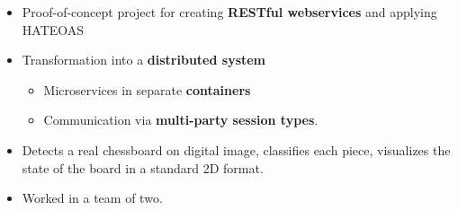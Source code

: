 

% 
% 
% 
% 
% 
% 






\begin{itemize}

\item Proof-of-concept project for creating \textbf{RESTful webservices} and applying HATEOAS

\item Transformation into a \textbf{distributed system}

\begin{itemize}
 \item Microservices in separate \textbf{containers}
 \item Communication via \textbf{multi-party session types}.
\end{itemize}

\end{itemize}

\begin{footnotesize}
\end{footnotesize}


\divider











\begin{itemize}

\item Detects a real chessboard on digital image, classifies each piece, visualizes the state of the board in a standard 2D format. 

\item Worked in a team of two.

\end{itemize}

